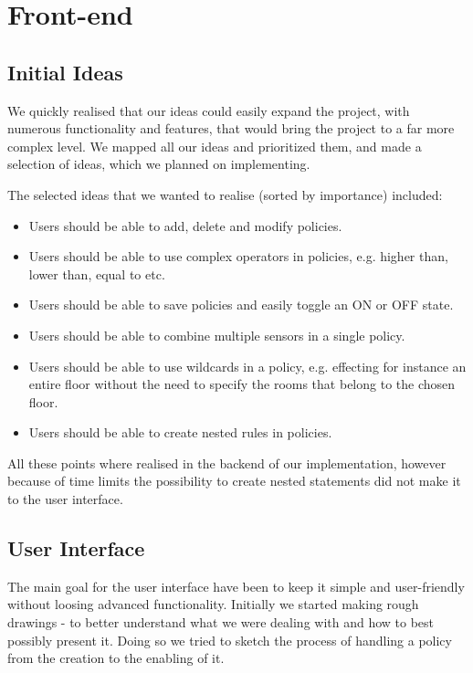 \section{Front-end}
\label{sec:front-end}

\subsection{Initial Ideas}
We quickly realised that our ideas could easily expand the project, with numerous functionality and features, that would bring the project to a far more complex level.
We mapped all our ideas and prioritized them, and made a selection of ideas, which we planned on implementing.

The selected ideas that we wanted to realise (sorted by importance) included:
\begin{itemize}
\item Users should be able to add, delete and modify policies.
\item Users should be able to use complex operators in policies, e.g. higher than, lower than, equal to etc.
\item Users should be able to save policies and easily toggle an ON or OFF state.
\item Users should be able to combine multiple sensors in a single policy.
\item Users should be able to use wildcards in a policy, e.g. effecting for instance an entire floor without the need to specify the rooms that belong to the chosen floor.
\item Users should be able to create nested rules in policies.
\end{itemize}

All these points where realised in the backend of our implementation, however because of time limits the possibility to create nested statements did not make it to the user interface.

\subsection{User Interface}
The main goal for the user interface have been to keep it simple and user-friendly without loosing advanced functionality. Initially we started making rough drawings - to better understand what we were dealing with and how to best possibly present it. Doing so we tried to sketch the process of handling a policy from the creation to the enabling of it.

